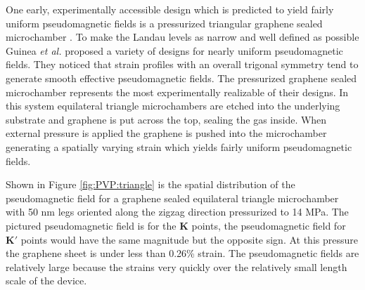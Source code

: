 One early, experimentally accessible design which is predicted to yield fairly uniform pseudomagnetic fields is a pressurized triangular graphene sealed microchamber \cite{Guinea2009}.
To make the Landau levels as narrow and well defined as possible Guinea \textit{et al.} proposed a variety of designs for nearly uniform pseudomagnetic fields.
They noticed that strain profiles with an overall trigonal symmetry tend to generate smooth effective pseudomagnetic fields.
The pressurized graphene sealed microchamber represents the most experimentally realizable of their designs.
In this system equilateral triangle microchambers are etched into the underlying substrate and graphene is put across the top, sealing the gas inside.
When external pressure is applied the graphene is pushed into the microchamber generating a spatially varying strain which yields fairly uniform pseudomagnetic fields.

Shown in Figure \ref{fig:PVP:triangle} is the spatial distribution of the pseudomagnetic field for a graphene sealed equilateral triangle microchamber with 50 nm legs oriented along the zigzag direction pressurized to 14 MPa.
The pictured pseudomagnetic field is for the $\bm{K}$ points, the pseudomagnetic field for $\bm{K'}$ points would have the same magnitude but the opposite sign.
At this pressure the graphene sheet is under less than 0.26\% strain.
The pseudomagnetic fields are relatively large because the strains very quickly over the relatively small length scale of the device.


